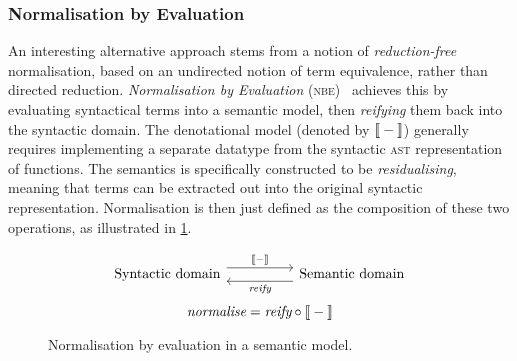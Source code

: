\documentclass[../../../main.tex]{subfiles}
\begin{document}
\subsubsection{Normalisation by Evaluation}
An interesting alternative approach stems from a notion of \emph{reduction-free} normalisation, based on an undirected notion of term equivalence, rather than directed reduction.
\emph{Normalisation by Evaluation} (\textsc{nbe})~\cite{filinski_nbe_2004} achieves this by evaluating syntactical terms into a semantic model, then \emph{reifying} them back into the syntactic domain.
The denotational model (denoted by $\text{\textlbrackdbl} - \text{\textrbrackdbl}$) generally requires implementing a separate datatype from the syntactic \textsc{ast} representation of functions.
The semantics is specifically constructed to be \emph{residualising}, meaning that terms can be extracted out into the original syntactic representation.
Normalisation is then just defined as the composition of these two operations, as illustrated in \cref{fig:nbe}.

\begin{figure}
\begin{equation*}
\begin{tikzcd}
  \text{Syntactic domain} \arrow[rr, "\text{\textlbrackdbl} - \text{\textrbrackdbl}", shift left=2] &  & \text{Semantic domain} \arrow[ll, "\textit{reify}", shift left=2]
\end{tikzcd}
\end{equation*}
\vspace{0.5ex}
\begin{equation*}
\textit{normalise} = \textit{reify} \circ \text{\textlbrackdbl} - \text{\textrbrackdbl}
\end{equation*}
\caption{Normalisation by evaluation in a semantic model.}
\label{fig:nbe}
\end{figure}
\end{document}
